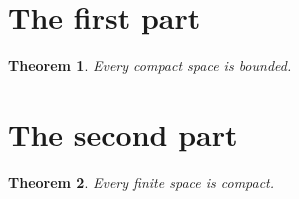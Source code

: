 \documentclass{article}
\renewcommand{\sec}[2]{\section{#2}\label{s:#1}}
\newtheorem{theorem}{Theorem}[section]
\begin{document}
\sec{one}{The first part}
\begin{theorem} Every compact space is bounded. \end{theorem}
\sec{two}{The second part}
\begin{theorem}\label{t:b} Every finite space is compact. \end{theorem}
\end{document}
